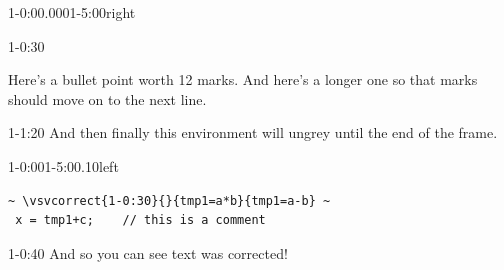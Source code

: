 


\begin{vsvframe}{1-0:00.000}{1-5:00}{right}

\begin{vsvgrey}{}{1-0:30}
\lipsum[66]
\end{vsvgrey}

\begin{itemize}
\lipsum[68]
\lipsum[75]
Here's a bullet point worth 12 marks.
And here's a longer one so that marks should move on to the next line.
\end{itemize}

\begin{vsvgrey}{}{1-1:20}
And then finally this environment will ungrey until the end of the frame.
\end{vsvgrey}

\end{vsvframe}

\begin{vsvframe}{1-0:00}{1-5:00.10}{left}

\lstset{columns=flexible,style=customc}
\begin{lstlisting}
~ \vsvcorrect{1-0:30}{}{tmp1=a*b}{tmp1=a-b} ~
 x = tmp1+c;    // this is a comment
\end{lstlisting}

\begin{vsvappear}{1-0:40}{}
And so you can see text was corrected!
\end{vsvappear}

\end{vsvframe}


